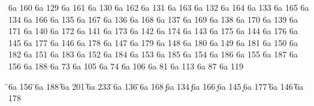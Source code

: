 \characterdef \cyrgup    6a   160
\characterdef \CYRGHCRS  6a   129
\characterdef \cyrghcrs  6a   161
\characterdef \CYRDJE    6a   130
\characterdef \cyrdje    6a   162
\characterdef \CYRTSHE   6a   131
\characterdef \cyrtshe   6a   163
\characterdef \CYRSHHA   6a   132
\characterdef \cyrshha   6a   164
\characterdef \CYRZHDSC  6a   133
\characterdef \cyrzhdsc  6a   165
\characterdef \CYRZDSC   6a   134
\characterdef \cyrzdsc   6a   166
\characterdef \CYRLJE    6a   135
\characterdef \cyrlje    6a   167
\characterdef \CYRYI     6a   136
\characterdef \cyryi     6a   168
\characterdef \CYRKDSC   6a   137
\characterdef \cyrkdsc   6a   169
\characterdef \CYRKBEAK  6a   138
\characterdef \cyrkbeak  6a   170
\characterdef \CYRKVCRS  6a   139
\characterdef \cyrkvcrs  6a   171
\characterdef \CYRAE     6a   140
\characterdef \cyrae     6a   172
\characterdef \CYRNDSC   6a   141
\characterdef \cyrndsc   6a   173
\characterdef \CYRNG     6a   142
\characterdef \cyrng     6a   174
\characterdef \CYRDZE    6a   143
\characterdef \cyrdze    6a   175
\characterdef \CYROTLD   6a   144
\characterdef \cyrotld   6a   176
\characterdef \CYRSDSC   6a   145
\characterdef \cyrsdsc   6a   177
\characterdef \CYRUSHRT  6a   146
\characterdef \cyrushrt  6a   178
\characterdef \CYRY      6a   147
\characterdef \cyry      6a   179
\characterdef \CYRYHCRS  6a   148
\characterdef \cyryhcrs  6a   180
\characterdef \CYRHDSC   6a   149
\characterdef \cyrhdsc   6a   181
\characterdef \CYRDZHE   6a   150
\characterdef \cyrdzhe   6a   182
\characterdef \CYRCHVCRS 6a   151
\characterdef \cyrchvcrs 6a   183
\characterdef \CYRCHRDSC 6a   152
\characterdef \cyrchrdsc 6a   184
\characterdef \CYRIE     6a   153
\characterdef \cyrie     6a   185
\characterdef \CYRSCHWA  6a   154
\characterdef \cyrschwa  6a   186
\characterdef \CYRNJE    6a   155
\characterdef \cyrnje    6a   187
\characterdef \CYRYO     6a   156
\characterdef \cyryo     6a   188
\characterdef \CYRII     6a   73
\characterdef \cyrii     6a   105
\characterdef \CYRJE     6a   74
\characterdef \cyrje     6a   106
\characterdef \CYRQ      6a   81
\characterdef \cyrq      6a   113
\characterdef \CYRW      6a   87
\characterdef \cyrw      6a   119

\accentdef \"  \CYRE   6a  156
\accentdef \"  \cyre   6a  188
\accentdef \U  \CYRI   6a  201
\accentdef \U  \cyri   6a  233
\accentdef \"  \CYRII  6a  136
\accentdef \"  \cyrii  6a  168
\accentdef \c  \CYRZ   6a  134
\accentdef \c  \cyrz   6a  166
\accentdef \k  \CYRS   6a  145
\accentdef \k  \cyrs   6a  177
\accentdef \U  \CYRU   6a  146
\accentdef \U  \cyru   6a  178


